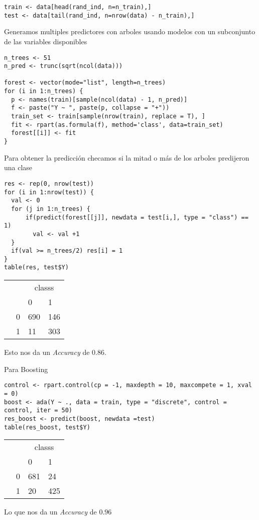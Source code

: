 \documentclass{article}
\begin{document}
\begin{enumerate}
\begin{lstlisting}
train <- data[head(rand_ind, n=n_train),]
test <- data[tail(rand_ind, n=nrow(data) - n_train),]
\end{lstlisting}
Generamos multiples predictores con arboles usando modelos con un subconjunto de las variables disponibles
\begin{lstlisting}
n_trees <- 51
n_pred <- trunc(sqrt(ncol(data)))

forest <- vector(mode="list", length=n_trees)
for (i in 1:n_trees) {
  p <- names(train)[sample(ncol(data) - 1, n_pred)]
  f <- paste("Y ~ ", paste(p, collapse = "+"))
  train_set <- train[sample(nrow(train), replace = T), ]
  fit <- rpart(as.formula(f), method='class', data=train_set)
  forest[[i]] <- fit
}
\end{lstlisting}
Para obtener la predicción checamos si la mitad o más de los arboles predijeron una clase
\begin{lstlisting}
res <- rep(0, nrow(test))
for (i in 1:nrow(test)) {
  val <- 0
  for (j in 1:n_trees) {
      if(predict(forest[[j]], newdata = test[i,], type = "class") == 1)
        val <- val +1 
  }
  if(val >= n_trees/2) res[i] = 1
}
table(res, test$Y)
\end{lstlisting}

\begin{table}[H]
\centering
\label{my-label}
\begin{tabular}{|l|l|l|l|}
\hline
\multicolumn{2}{|l|}{\multirow{2}{*}{}} & \multicolumn{2}{c|}{classs} \\ \cline{3-4} 
\multicolumn{2}{|l|}{} & 0 & 1 \\ \hline
\multirow{1}{*}{ \parbox[t]{1mm}{} } & 0 & 690 & 146 \\ \cline{2-4} & 1 & 11 & 303 \\ \hline
\end{tabular}
\end{table}

Esto nos da un \emph{Accuracy} de $0.86$.

Para Boosting
\begin{lstlisting}
control <- rpart.control(cp = -1, maxdepth = 10, maxcompete = 1, xval = 0)
boost <- ada(Y ~ ., data = train, type = "discrete", control = control, iter = 50)
res_boost <- predict(boost, newdata =test)
table(res_boost, test$Y)
\end{lstlisting}
\begin{table}[H]
\centering
\label{my-label2}
\begin{tabular}{|l|l|l|l|}
\hline
\multicolumn{2}{|l|}{\multirow{2}{*}{}} & \multicolumn{2}{c|}{classs} \\ \cline{3-4} 
\multicolumn{2}{|l|}{} & 0 & 1 \\ \hline
\multirow{1}{*}{ \parbox[t]{1mm}{} } & 0 & 681 & 24 \\ \cline{2-4} & 1 & 20 & 425 \\ \hline
\end{tabular}
\end{table}

Lo que nos da un \emph{Accuracy} de $0.96$


\end{enumerate}
\end{document}
